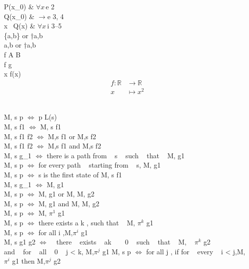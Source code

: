 P(x_0) & $\forall x \, \mathrm{e}$ 2 \\
Q(x_0) & $\to \mathrm{e}$ 3, 4 \\

\forall x \, Q(x) & $\forall x \, \mathrm{i}$ 3--5 \\







\{a,b\} or \set†{a,b} \\
\langle a,b \rangle or \gens†{a,b} \\


f \colon A \to B \\

f \circ g \\
x \mapsto f(x) \\

\begin{align*}
	f \colon \mathbb{R} &\to \mathbb{R} \\
	x &\mapsto x^2
\end{align*}


\newline \\
M, s \models p $\Leftrightarrow$ p \in L(s) \\
M, s \models \not f1 $\Leftrightarrow$ M, s \nvdash f1 \\
M, s \models f1 \vee f2 $\Leftrightarrow$ M,s \models f1 or M,s \nvdash f2 \\
M, s \models f1 \wedge f2 $\Leftrightarrow$  M,s \models f1 and M,s \nvdash f2 \\
M, s \models {} g_{1} $\Leftrightarrow$ there is a path \pi  from ~  s ~   such ~  that  ~ M, \pi \models g1 \\
M, s \models p $\Leftrightarrow$ for every path \pi  ~ starting from  ~  s, M, \pi \models g1 \\
M, s \models p $\Leftrightarrow$ s is the first state of \piand M, s \models f1 \\
M, s \models \not g_{1} $\Leftrightarrow$ M, \pi  \nvdash g1\\
M, s \models p $\Leftrightarrow$  M, \pi  \models g1  or  M, \pi  M, \pi  \models g2\\
M, s \models p $\Leftrightarrow$ M, \pi  \models g1  and  M, \pi  M, \pi  \models g2 \\
M, s \models p $\Leftrightarrow$ M, $\pi^{1}$ \models g1 \\
M, s \models p $\Leftrightarrow$ there exists a k , such that  ~ M, $\pi^{k}$  \models g1\\
M, s \models p $\Leftrightarrow$ for all i ,M,$\pi^{i}$ \models g1 \\
M, s \models g1 \bugcup g2 $\Leftrightarrow$ ~  there  ~ exists  ~ ak  ~ \ge  ~ 0 ~  such ~  that  ~ M,  ~ $\pi^{k}$ \models g2\\
and  ~ for  ~ all ~  0  ~ \le j < k, M,$\pi^{j}$ \models g1
M, s \models p $\Leftrightarrow$ for all j , if for ~  every  ~ i < j,M,$\pi^{i}$ \nvdash g1 then M,$\pi^{j}$ \models g2\\


